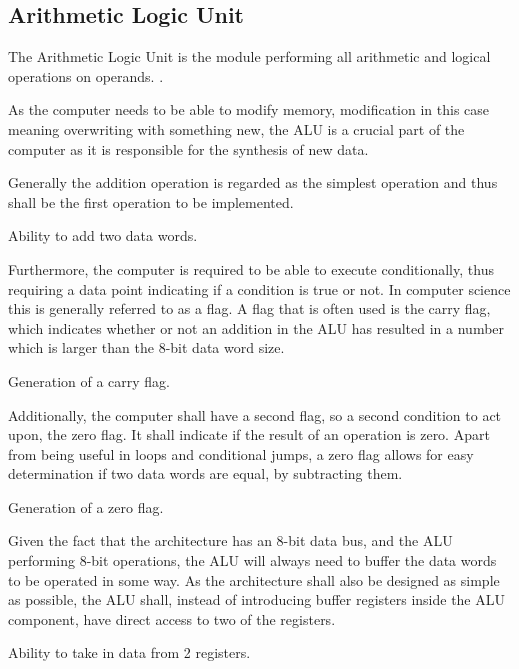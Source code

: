  \subsection{Arithmetic Logic Unit}
The Arithmetic Logic Unit is the module performing all arithmetic and logical operations on operands. \cite{vonneuman1945a}.


As the computer needs to be able to modify memory, modification in this case meaning overwriting with something new, the ALU is a crucial part of the computer as it is responsible for the synthesis of new data.

Generally the addition operation is regarded as the simplest operation and thus shall be the first operation to be implemented.

\begin{turing-requirement}
  Ability to add two data words.
\end{turing-requirement}

Furthermore, the computer is required to be able to execute conditionally, thus requiring a data point indicating if a condition is true or not. In computer science this is generally referred to as a flag. A flag that is often used is the carry flag, which indicates whether or not an addition in the ALU has resulted in a number which is larger than the 8-bit data word size.


\begin{turing-requirement}
  Generation of a carry flag. 
\end{turing-requirement}

Additionally, the computer shall have a second flag, so a second condition to act upon, the zero flag. It shall indicate if the result of an operation is zero. Apart from being useful in loops and conditional jumps, a zero flag allows for easy determination if two data words are equal, by subtracting them. 
\begin{feat-requirement}
  Generation of a zero flag.
\end{feat-requirement}

Given the fact that the architecture has an 8-bit data bus, and the ALU performing 8-bit operations, the ALU will always need to buffer the data words to be operated in some way. As the architecture shall also be designed as simple as possible, the ALU shall, instead of introducing buffer registers inside the ALU component, have direct access to two of the registers.
\begin{arch-requirement}
  Ability to take in data from 2 registers.
\end{arch-requirement}

